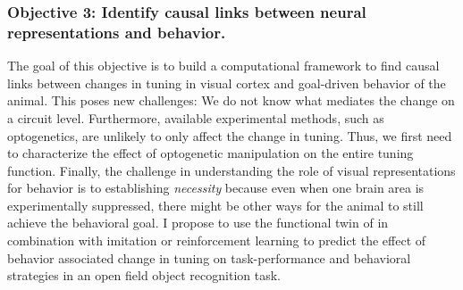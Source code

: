 \documentclass[COG,11pt]{ercgrant}
\begin{document}
\subsubsection{Objective 3: Identify causal links between neural representations and behavior.\hfill{}}

The goal of this objective is to build a computational framework to find causal links between changes in tuning in visual cortex and goal-driven behavior of the animal. 
This poses new challenges: We do not know what mediates the change on a circuit level.  Furthermore, available experimental methods, such as optogenetics, are unlikely to only affect the change in tuning. 
Thus, we first need to characterize the effect of optogenetic manipulation on the entire tuning function. Finally, the challenge in understanding the role of visual representations for behavior is to establishing \textit{necessity} because even when one brain area is experimentally suppressed, there might be other ways for the animal to still achieve the behavioral goal. 
I propose to use the functional twin of in combination with imitation or reinforcement learning to predict the effect of behavior associated change in tuning on task-performance and behavioral strategies in an open field object recognition task. 

\end{document}
